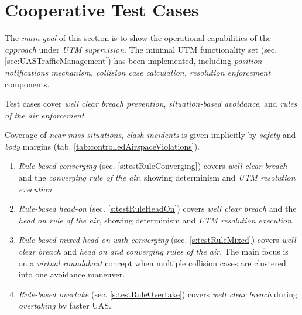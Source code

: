 \cleardoublepage
\section{Cooperative Test Cases}\label{s:cooperativeTestCases}
    
    \noindent The \emph{main goal} of this section is to show the operational capabilities of the \emph{approach} under \emph{UTM supervision}. The minimal UTM functionality set (sec. \ref{sec:UASTrafficManagement}) has been implemented, including \emph{position notifications mechanism, collision case calculation, resolution enforcement} components. 
    
    Test cases cover \emph{well clear breach prevention}, \emph{situation-based avoidance}, and \emph{rules of the air enforcement}. 
    
    Coverage of \emph{near miss situations}, \emph{clash incidents} is given implicitly by \emph{safety} and \emph{body} margins (tab. \ref{tab:controlledAirspaceViolations}).
    
    \begin{enumerate}
        \item \emph{Rule-based converging} (sec. \ref{s:testRuleConverging}) covers \emph{well clear breach} and the \emph{converging rule of the air}, showing determinism and \emph{UTM resolution execution}.
        
        \item \emph{Rule-based head-on} (sec. \ref{s:testRuleHeadOn}) covers \emph{well clear breach} and the  \emph{head on rule of the air}, showing determinism and \emph{UTM resolution execution}.
        
        \item \emph{Rule-based mixed head on with converging} (sec. \ref{s:testRuleMixed}) covers \emph{well clear breach} and \emph{head on and converging rules of the air}. The main focus is on a \emph{virtual roundabout} concept when multiple collision cases are clustered into one avoidance maneuver. 
        
        \item \emph{Rule-based overtake} (sec. \ref{s:testRuleOvertake}) covers \emph{well clear breach} during \emph{overtaking} by faster UAS.
    \end{enumerate}

